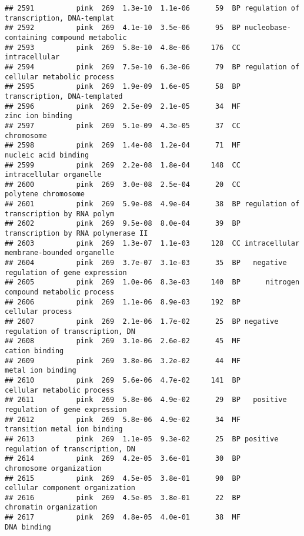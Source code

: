 \documentclass[]{article}
\begin{document}
\begin{verbatim}
## 2591          pink  269  1.3e-10  1.1e-06      59  BP regulation of transcription, DNA-templat
## 2592          pink  269  4.1e-10  3.5e-06      95  BP nucleobase-containing compound metabolic
## 2593          pink  269  5.8e-10  4.8e-06     176  CC                            intracellular
## 2594          pink  269  7.5e-10  6.3e-06      79  BP regulation of cellular metabolic process
## 2595          pink  269  1.9e-09  1.6e-05      58  BP             transcription, DNA-templated
## 2596          pink  269  2.5e-09  2.1e-05      34  MF                         zinc ion binding
## 2597          pink  269  5.1e-09  4.3e-05      37  CC                               chromosome
## 2598          pink  269  1.4e-08  1.2e-04      71  MF                     nucleic acid binding
## 2599          pink  269  2.2e-08  1.8e-04     148  CC                  intracellular organelle
## 2600          pink  269  3.0e-08  2.5e-04      20  CC                      polytene chromosome
## 2601          pink  269  5.9e-08  4.9e-04      38  BP regulation of transcription by RNA polym
## 2602          pink  269  9.5e-08  8.0e-04      39  BP       transcription by RNA polymerase II
## 2603          pink  269  1.3e-07  1.1e-03     128  CC intracellular membrane-bounded organelle
## 2604          pink  269  3.7e-07  3.1e-03      35  BP   negative regulation of gene expression
## 2605          pink  269  1.0e-06  8.3e-03     140  BP      nitrogen compound metabolic process
## 2606          pink  269  1.1e-06  8.9e-03     192  BP                         cellular process
## 2607          pink  269  2.1e-06  1.7e-02      25  BP negative regulation of transcription, DN
## 2608          pink  269  3.1e-06  2.6e-02      45  MF                           cation binding
## 2609          pink  269  3.8e-06  3.2e-02      44  MF                        metal ion binding
## 2610          pink  269  5.6e-06  4.7e-02     141  BP               cellular metabolic process
## 2611          pink  269  5.8e-06  4.9e-02      29  BP   positive regulation of gene expression
## 2612          pink  269  5.8e-06  4.9e-02      34  MF             transition metal ion binding
## 2613          pink  269  1.1e-05  9.3e-02      25  BP positive regulation of transcription, DN
## 2614          pink  269  4.2e-05  3.6e-01      30  BP                  chromosome organization
## 2615          pink  269  4.5e-05  3.8e-01      90  BP          cellular component organization
## 2616          pink  269  4.5e-05  3.8e-01      22  BP                   chromatin organization
## 2617          pink  269  4.8e-05  4.0e-01      38  MF                              DNA binding

\end{verbatim}
\end{document}
